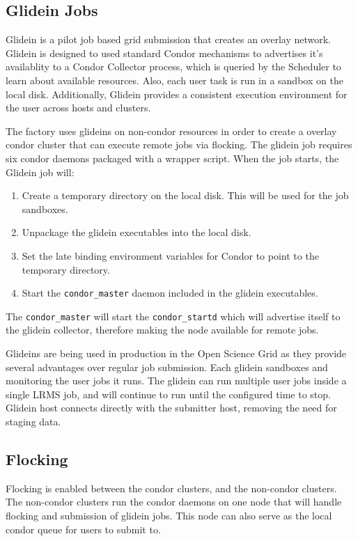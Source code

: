 \documentclass[11pt]{article}
\begin{document}
\subsection{Glidein Jobs}
Glidein  \cite{frey2002condor} is a pilot job based grid submission that creates an overlay network.  Glidein is designed to used standard Condor mechanisms to advertises it's availablity to a Condor Collector process, which is queried by the Scheduler to learn about available resources.  Also, each user task is run in a sandbox on the local disk.  Additionally, Glidein provides a consistent execution environment for the user across hosts and clusters.  

The factory uses glideins on non-condor resources in order to create a overlay condor cluster that can execute remote jobs via flocking.  The glidein job requires six condor daemons packaged with a wrapper script.  When the job starts, the Glidein job will:

\begin{enumerate}
\item Create a temporary directory on the local disk.  This will be used for the job sandboxes.
\item Unpackage the glidein executables into the local disk.
\item Set the late binding environment variables for Condor to point to the temporary directory.
\item Start the  \texttt{condor\_master} daemon included in the glidein executables.
\end{enumerate}

The \texttt{condor\_master} will start the \texttt{condor\_startd} which will advertise itself to the glidein collector, therefore making the node available for remote jobs.  

Glideins are being used in production in the Open Science Grid as they provide several advantages over regular job submission.  Each glidein sandboxes and monitoring the user jobs it runs.  The glidein can run multiple user jobs inside a single LRMS job, and will continue to run until the configured time to stop.  Glidein host connects directly with the submitter host, removing the need for staging data.

\subsection{Flocking}
Flocking is enabled between the condor clusters, and the non-condor clusters.  The non-condor clusters run the condor daemons on one node that will handle flocking and submission of glidein jobs.  This node can also serve as the local condor queue for users to submit to. 
\end{document}

